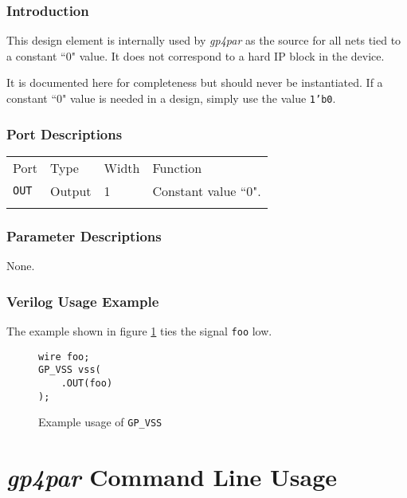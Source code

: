 \documentclass[11pt]{article}
\newcommand{\namestyle}[1]{\textit{#1}}
\newcommand{\tokenstyle}[1]{\texttt{#1}}
\newcommand{\wirestyle}[1]{\texttt{#1}}
\newcommand{\datastyle}[1]{\texttt{#1}}
\newcommand{\whenstyle}[1]{{\fontseries{sb}\selectfont#1}}
\newcommand{\thinhline}{\Xhline{1\arrayrulewidth}}
\newcommand{\thickhline}{\Xhline{2.5\arrayrulewidth}}
\begin{document}
\subsubsection{Introduction}
This design element is internally used by \namestyle{gp4par} as the source for all nets tied to a constant ``0" value. It does not correspond to a hard IP block in the device.

It is documented here for completeness but should never be instantiated. If a constant ``0" value is needed in a
design, simply use the value \datastyle{1'b0}.

\subsubsection{Port Descriptions}

\begin{tabularx}{\textwidth}{lllX}
\thinhline
\whenstyle{Port} & \whenstyle{Type} & \whenstyle{Width} & \whenstyle{Function} \\
\thickhline
\tokenstyle{OUT} & Output & 1 & Constant value ``0". \\
\thinhline
\end{tabularx}

\subsubsection{Parameter Descriptions}

None.

\subsubsection{Verilog Usage Example}

The example shown in figure \ref{gp-vss-example} ties the signal \wirestyle{foo} low.

\begin{figure}[h]
\begin{lstlisting}
wire foo;
GP_VSS vss(
	.OUT(foo)
);
\end{lstlisting}
\caption{Example usage of \tokenstyle{GP\_VSS}}
\label{gp-vss-example}
\end{figure}


\pagebreak
\section{\namestyle{gp4par} Command Line Usage}
\end{document}
